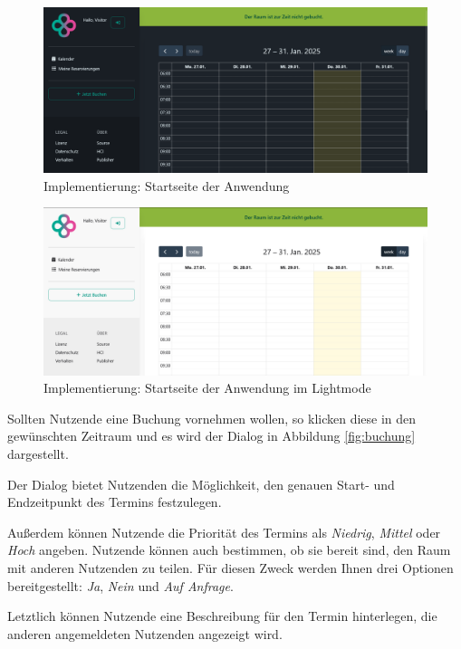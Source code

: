 \begin{figure}[ht]
    \centering
    \includegraphics[width=\textwidth]{figures/impl-views/calendar_dark}
    \caption{Implementierung: Startseite der Anwendung}
    \label{fig:impl-startseite}
\end{figure}
\begin{figure}[ht]
    \centering
    \includegraphics[width=\textwidth]{figures/impl-views/calendar}
    \caption{Implementierung: Startseite der Anwendung im Lightmode}
    \label{fig:impl-startseite_lightmode}
\end{figure}
\pagebreak

Sollten Nutzende eine Buchung vornehmen wollen, so klicken diese in den gewünschten Zeitraum
und es wird der Dialog in Abbildung \ref{fig:buchung} dargestellt.

Der Dialog bietet Nutzenden die Möglichkeit, den genauen Start- und Endzeitpunkt des Termins festzulegen.

Außerdem können Nutzende die Priorität des Termins als \textit{Niedrig}, \textit{Mittel} oder \textit{Hoch} angeben.
Nutzende können auch bestimmen, ob sie bereit sind, den Raum mit anderen Nutzenden zu teilen.
Für diesen Zweck werden Ihnen drei Optionen bereitgestellt: \textit{Ja}, \textit{Nein} und \textit{Auf Anfrage}.

Letztlich können Nutzende eine Beschreibung für den Termin hinterlegen, die anderen angemeldeten Nutzenden angezeigt wird.

